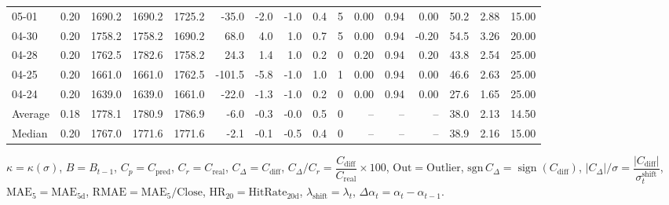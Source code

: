 \begin{threeparttable}
{\begin{tabular}{lrrrrrrrrrrrrrrr}
  05-01 &     0.20 & 1690.2 & 1690.2 & 1725.2 &      -35.0 &           -2.0 &                     -1.0 &                 0.4 &              5 &       0.00 &      0.94 &           0.00 &             50.2 &            2.88 &                  15.00 \\
  04-30 &     0.20 & 1758.2 & 1758.2 & 1690.2 &       68.0 &            4.0 &                      1.0 &                 0.7 &              5 &       0.00 &      0.94 &          -0.20 &             54.5 &            3.26 &                  20.00 \\
  04-28 &     0.20 & 1762.5 & 1782.6 & 1758.2 &       24.3 &            1.4 &                      1.0 &                 0.2 &              0 &       0.20 &      0.94 &           0.20 &             43.8 &            2.54 &                  25.00 \\
  04-25 &     0.20 & 1661.0 & 1661.0 & 1762.5 &     -101.5 &           -5.8 &                     -1.0 &                 1.0 &              1 &       0.00 &      0.94 &           0.00 &             46.6 &            2.63 &                  25.00 \\
  04-24 &     0.20 & 1639.0 & 1639.0 & 1661.0 &      -22.0 &           -1.3 &                     -1.0 &                 0.2 &              0 &       0.00 &      0.94 &           0.00 &             27.6 &            1.65 &                  25.00 \\
Average &     0.18 & 1778.1 & 1780.9 & 1786.9 &       -6.0 &           -0.3 &                     -0.0 &                 0.5 &              0 &         -- &        -- &             -- &             38.0 &            2.13 &                  14.50 \\
 Median &     0.20 & 1767.0 & 1771.6 & 1771.6 &       -2.1 &           -0.1 &                     -0.5 &                 0.4 &              0 &         -- &        -- &             -- &             38.9 &            2.16 &                  15.00 \\
\bottomrule
\end{tabular}
}
\begin{tablenotes}\footnotesize
\item $\kappa=\kappa(\sigma)$, $B=B_{t-1}$, $C_p=C_{\text{pred}}$, $C_r=C_{\text{real}}$, $C_\Delta=C_{\text{diff}}$, $C_\Delta/C_r=\dfrac{C_{\text{diff}}}{C_{\text{real}}}\times100$, $\mathrm{Out}=\text{Outlier}$, $\mathrm{sgn}\,C_\Delta=\operatorname{sign}(C_{\text{diff}})$, $|C_\Delta|/\sigma=\dfrac{|C_{\text{diff}}|}{\sigma_t^{\text{shift}}}$, $\mathrm{MAE}_5=\mathrm{MAE}_{5\text{d}}$, $\mathrm{RMAE}= \mathrm{MAE}_5 / \text{Close}$, $\mathrm{HR}_{20}=\mathrm{HitRate}_{20\text{d}}$, 
$\lambda_{\text{shift}}=\lambda_t$, 
$\Delta\alpha_t=\alpha_t-\alpha_{t-1}$.
\end{tablenotes}
\end{threeparttable}
\endgroup

